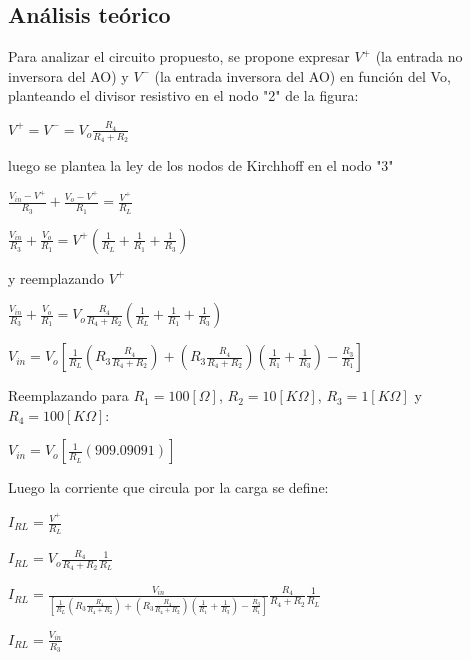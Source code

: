 \subsection{Análisis teórico}
Para analizar el circuito propuesto, se propone expresar $V^+$ (la entrada no inversora del AO) y $V^-$ (la entrada inversora del AO) en función del Vo, planteando el divisor resistivo en el nodo "2" de la figura:
\begin{center}
	$V^+ = V^- = V_o \frac{R_4}{R_4 + R_2}$
\end{center}
luego se plantea la ley de los nodos de Kirchhoff en el nodo "3"
\begin{center}
	$\frac{V_{in} - V^+ }{R_3} + \frac{V_o - V^+ }{R_1} = \frac{V^+}{R_L}$
\end{center}
\begin{center}
	$\frac{V_{in}}{R_3} + \frac{V_o}{R_1} = V^+ (\frac{1}{R_L} + \frac{1}{R_1} + \frac{1}{R_3})$
\end{center}
y reemplazando $V^+$
\begin{center}
	$\frac{V_{in}}{R_3} + \frac{V_o}{R_1} = V_o \frac{R_4}{R_4 + R_2} (\frac{1}{R_L} + \frac{1}{R_1} + \frac{1}{R_3})$
\end{center}
\begin{center}
	$V_{in} = V_o[\frac{1}{R_L}( R_3 \frac{R_4}{R_4 + R_2}) + (R_3 \frac{R_4}{R_4 + R_2}) (\frac{1}{R_1} + \frac{1}{R_3} ) - \frac{R_3}{R_1}]$
\end{center}
Reemplazando para $R_1=100[\Omega]$, $R_2=10[K\Omega]$, $R_3=1[K\Omega]$ y $R_4=100[K\Omega]$:
\begin{center}
	$V_{in} = V_o[\frac{1}{R_L}(909.09091)]$
\end{center}
Luego la corriente que circula por la carga se define:
\begin{center}
	$I_{RL} = \frac{V^+}{R_L}$
\end{center}
\begin{center}
	$I_{RL} = V_o \frac{R_4}{R_4 + R_2} \frac{1}{R_L}$
\end{center}
\begin{center}
	$I_{RL} = \frac{V_{in}}{[\frac{1}{R_L}( R_3 \frac{R_4}{R_4 + R_2}) + (R_3 \frac{R_4}{R_4 + R_2}) (\frac{1}{R_1} + \frac{1}{R_3} ) - \frac{R_3}{R_1}]} \frac{R_4}{R_4 + R_2} \frac{1}{R_L}$
\end{center}
\begin{center}
	$I_{RL} = \frac{V_{in}}{R_3}$
\end{center}
\begin{center}
\end{center}
